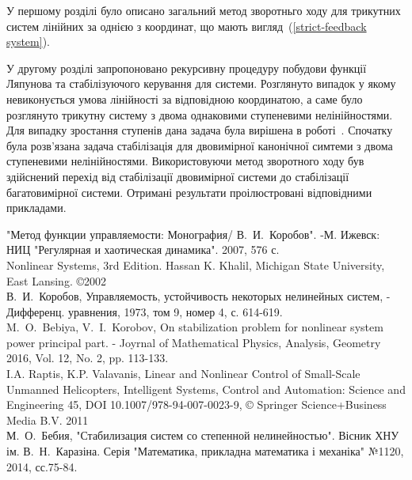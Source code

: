 \documentclass{article}
\begin{document}
У першому розділі було описано загальний метод зворотньго 
ходу для трикутних систем лінійних за однією з координат,
що мають вигляд~(\ref{strict-feedback system}).

У другому розділі запропоновано рекурсивну процедуру побудови функції Ляпунова та стабілізуючого керування 
для системи. 
Розглянуто випадок у якому невиконується умова лінійності за відповідною
координатою, а саме було розглянуто трикутну систему з двома однаковими ступеневими нелінійностями. 
Для випадку зростання ступенів дана задача була вирішена в роботі~\cite{BebiyaKorobov}.  
Спочатку була розв'язана задача стабілізація для двовимірної канонічної симтеми 
з двома ступеневими нелінійностями. Використовуючи метод зворотного ходу був здійснений перехід від стабілізації двовимірної системи
до стабілізації багатовимірної системи. Отримані результати проілюстровані відповідними прикладами.

\pagebreak
\begin{thebibliography}{}
      "Метод функции управляемости: Монография/ В.~И.~Коробов". 
    -М. Ижевск: НИЦ "Регулярная и хаотическая динамика". 2007, 576 с.\\
    Nonlinear Systems, 3rd Edition. Hassan K. Khalil, Michigan State University, East Lansing. ©2002\\ 
    В.~И.~Коробов, Управляемость, устойчивость некоторых нелинейных систем, 
    -  Дифференц. уравнения, 1973, том 9, номер 4, с. 614-619.\\
    M.~O.~Bebiya, V.~I.~Korobov, On stabilization problem for nonlinear system power principal part. 
    - Joyrnal of Mathematical Physics, Analysis, Geometry 2016, Vol. 12, No. 2, pp. 113-133.\\
    I.A. Raptis, K.P. Valavanis, Linear and Nonlinear Control of Small-Scale Unmanned Helicopters, 
    Intelligent Systems, Control and Automation: Science and Engineering 45, 
    DOI 10.1007/978-94-007-0023-9, © Springer Science+Business Media B.V. 2011\\
    М.~О.~Бебия, "Стабилизация систем со степенной нелинейностью". Вісник ХНУ ім. В.~Н.~Каразіна. 
    Серія "Математика, прикладна математика і механіка" №1120, 2014, сс.75-84.\\

\end{thebibliography}
\end{document}
